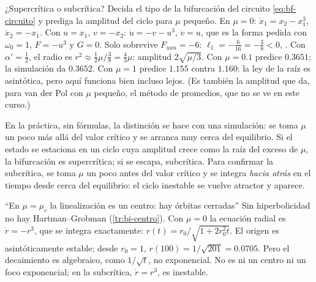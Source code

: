 \begin{ejemplo}[label=ej:bf-l1circuito]{¿Supercrítica o subcrítica?}
Decida el tipo de la bifurcación del circuito \eqref{eq:bf-circuito} y prediga la amplitud del ciclo para $\mu$ pequeño.
\solucion En $\mu=0$: $\dot x_1=x_2-x_1^3$, $\dot x_2=-x_1$. Con $u=x_1$, $v=-x_2$: $\dot u=-v-u^3$, $\dot v=u$, que es la forma pedida con $\omega_0=1$, $F=-u^3$ y $G=0$. Solo sobrevive $F_{uuu}=-6$: $\ell_1=-\tfrac6{16}=-\tfrac38<0$, . Con $\alpha'=\tfrac12$, el radio es $r^2\approx\tfrac12\mu/\tfrac38=\tfrac43\mu$: amplitud $2\sqrt{\mu/3}$. Con $\mu=0.1$ predice $0.3651$; la simulación da $0.3652$. Con $\mu=1$ predice $1.155$ contra $1.160$: la ley de la raíz es asintótica, pero aquí funciona bien incluso lejos. (Es también la amplitud que da, para van der Pol con $\mu$ pequeño, el método de promedios, que no se ve en este curso.)
\end{ejemplo}


En la práctica, sin fórmulas, la distinción se hace con una simulación: se toma $\mu$ un poco más allá del valor crítico y se arranca muy cerca del equilibrio. Si el estado se estaciona en un ciclo cuya amplitud crece como la raíz del exceso de $\mu$, la bifurcación es supercrítica; si se escapa, subcrítica. Para confirmar la subcrítica, se toma $\mu$ un poco antes del valor crítico y se integra \emph{hacia atrás} en el tiempo desde cerca del equilibrio: el ciclo inestable se vuelve atractor y aparece.

\begin{trampa}[label=tr:bf-centro]{``En $\mu=\mu_c$ la linealización es un centro: hay órbitas cerradas''}
Sin hiperbolicidad no hay Hartman--Grobman (\cref{tr:bi-centro}). Con $\mu=0$ la ecuación radial es $\dot r=-r^3$, que se integra exactamente: $r(t)=r_0/\sqrt{1+2r_0^2t}$. El origen es asintóticamente estable; desde $r_0=1$, $r(100)=1/\sqrt{201}=0.0705$. Pero el decaimiento es algebraico, como $1/\sqrt t$, no exponencial. No es ni un centro ni un foco exponencial; en la subcrítica, $\dot r=r^3$, es inestable.
\end{trampa}

